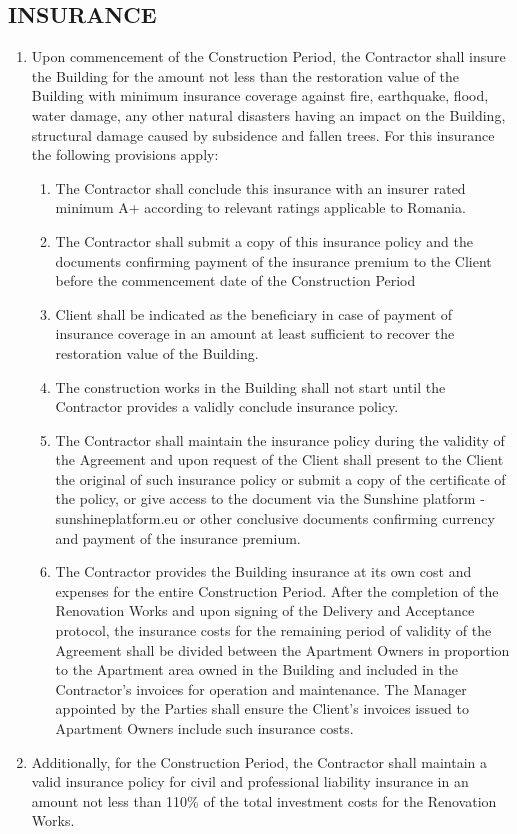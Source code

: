 \begin{multicols}{2}
\subsection{INSURANCE}
\begin{enumerate}
	\item	Upon commencement of the Construction Period, the Contractor shall insure the Building for the amount not less than the restoration value of the Building with minimum insurance coverage against fire, earthquake, flood, water damage, any other natural disasters having an impact on the Building, structural damage caused by subsidence and fallen trees. For this insurance the following provisions apply:
	\begin{enumerate}
		\item	The Contractor shall conclude this insurance with an insurer rated minimum A+ according to relevant ratings applicable to Romania.
		\item	The Contractor shall submit a copy of this insurance policy and the documents confirming payment of the insurance premium to the Client before the commencement date of the Construction Period
		\item	Client shall be indicated as the beneficiary in case of payment of insurance coverage in an amount at least sufficient to recover the restoration value of the Building.
		\item	The construction works in the Building shall not start until the Contractor provides a validly conclude insurance policy.
		\item	The Contractor shall maintain the insurance policy during the validity of the Agreement and upon request of the Client shall present to the Client the original of such insurance policy or submit a copy of the certificate of the policy, or give access to the document via the Sunshine platform - sunshineplatform.eu or other conclusive documents confirming currency and payment of the insurance premium.
		\item	The Contractor provides the Building insurance at its own cost and expenses for the entire Construction Period. After the completion of the Renovation Works and upon signing of the Delivery and Acceptance protocol, the insurance costs for the remaining period of validity of the Agreement shall be divided between the Apartment Owners in proportion to the Apartment area owned in the Building and included in the Contractor’s invoices for operation and maintenance. The Manager appointed by the Parties shall ensure the Client’s invoices issued to Apartment Owners include such insurance costs.
	\end{enumerate}
	\item	Additionally, for the Construction Period, the Contractor shall maintain a valid insurance policy for civil and professional liability insurance in an amount not less than 110\% of the total investment costs for the Renovation Works.
\end{enumerate}


\end{multicols}
